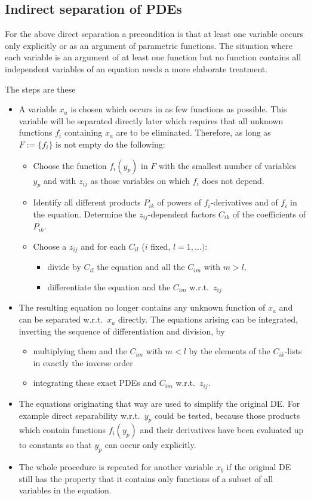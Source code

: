 \subsection{Indirect separation of PDEs}
For the above direct separation a precondition is that at least one
variable occurs only explicitly or as an argument of parametric
functions.  The situation where each variable is an argument of at least
one function but no function contains all independent variables of an
equation needs a more elaborate treatment.

The steps are these
\begin{itemize}
 \item A variable $x_a$ is chosen which occurs in as few functions as possible.
 This variable will be separated directly later which
 requires that all unknown functions $f_i$ containing $x_a$ are to be
 eliminated. Therefore, as long as $F:=\{f_i\}$ is not empty do the following:
 \begin{itemize}
  \item Choose the function $f_i(y_p)$ in $F$ with the smallest number of
  variables $y_p$ and with $z_{ij}$ as those variables on which $f_i$ does
  not depend.
  \item Identify all different products $P_{ik}$ of powers of
  $f_i$-derivatives and of $f_i$ in the equation.
  Determine the $z_{ij}$-dependent factors $C_{ik}$ of the coefficients
  of $P_{ik}$.
  \item Choose a $z_{ij}$ and for each $C_{il}$ ($i$ fixed, $l=1,\ldots)$:
  \begin{itemize}
   \item divide by $C_{il}$ the equation and all the $C_{im}$ with $m>l,$
   \item differentiate the equation and the $C_{im}$ w.r.t.\ $z_{ij}$
  \end{itemize}
 \end{itemize}
 \item The resulting equation no longer contains any unknown function of $x_a$
 and can be separated w.r.t.\ $x_a$ directly. The
 equations arising can be integrated, inverting the sequence of differentiation
 and division, by
 \begin{itemize}
  \item multiplying them and the $C_{im}$ with $m<l$ by the elements
  of the $C_{ik}$-lists in exactly the inverse order
  \item integrating these exact PDEs and $C_{im}$ w.r.t.\ $z_{ij}$.
 \end{itemize}
 \item The equations originating that way are used to simplify the original
 DE\@. For example direct separability w.r.t.\ $y_p$ could be tested, because
 those products which contain functions $f_i(y_p)$ and their derivatives
 have been evaluated up to constants so that $y_p$ can occur only explicitly.
 \item The whole procedure is repeated for another variable $x_b$ if the
 original DE still has the property that it contains only functions of
 a subset of all variables in the equation.
\end{itemize}

